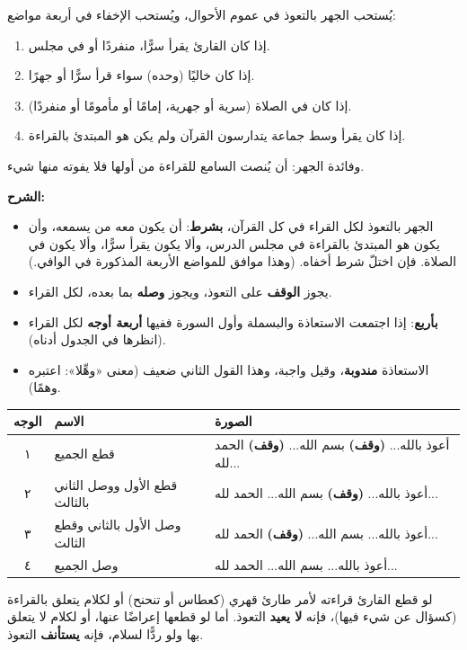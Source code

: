 \begin{qaida}
يُستحب الجهر بالتعوذ في عموم الأحوال، ويُستحب الإخفاء في أربعة مواضع:
\begin{enumerate}
\item إذا كان القارئ يقرأ سرًّا، منفردًا أو في مجلس.
\item إذا كان خاليًا (وحده) سواء قرأ سرًّا أو جهرًا.
\item إذا كان في الصلاة (سرية أو جهرية، إمامًا أو مأمومًا أو منفردًا).
\item إذا كان يقرأ وسط جماعة يتدارسون القرآن ولم يكن هو المبتدئ بالقراءة.
\end{enumerate}
وفائدة الجهر: أن يُنصت السامع للقراءة من أولها فلا يفوته منها شيء.
\end{qaida}

\begin{tahrir}
\medskip
\textbf{الشرح:}
\begin{itemize}
\item الجهر بالتعوذ لكل القراء في كل القرآن، \textbf{بشرط}: أن يكون معه من يسمعه، وأن يكون هو المبتدئ بالقراءة في مجلس الدرس، وألا يكون يقرأ سرًّا، وألا يكون في الصلاة. فإن اختلّ شرط أخفاه. (وهذا موافق للمواضع الأربعة المذكورة في الوافي.)
\item يجوز \textbf{الوقف} على التعوذ، ويجوز \textbf{وصله} بما بعده، لكل القراء.
\item \textbf{بأربع}: إذا اجتمعت الاستعاذة والبسملة وأول السورة ففيها \textbf{أربعة أوجه} لكل القراء (انظرها في الجدول أدناه).
\item الاستعاذة \textbf{مندوبة}، وقيل واجبة، وهذا القول الثاني ضعيف (معنى «وهِّلا»: اعتبره وهمًا).
\end{itemize}
\end{tahrir}

\begin{khulasa}
\centering
\renewcommand{\arraystretch}{1.5}
\begin{tabular}{c l l}
\toprule
\textbf{الوجه} & \textbf{الاسم} & \textbf{الصورة}\\
\midrule
١ & قطع الجميع & أعوذ بالله... \textbf{(وقف)} بسم الله... \textbf{(وقف)} الحمد لله...\\
٢ & قطع الأول ووصل الثاني بالثالث & أعوذ بالله... \textbf{(وقف)} بسم الله... الحمد لله...\\
٣ & وصل الأول بالثاني وقطع الثالث & أعوذ بالله... بسم الله... \textbf{(وقف)} الحمد لله...\\
٤ & وصل الجميع & أعوذ بالله... بسم الله... الحمد لله...\\
\bottomrule
\end{tabular}
\end{khulasa}

\begin{tanbih}
لو قطع القارئ قراءته لأمر طارئ قهري (كعطاس أو تنحنح) أو لكلام يتعلق بالقراءة (كسؤال عن شيء فيها)، فإنه \textbf{لا يعيد} التعوذ.
أما لو قطعها إعراضًا عنها، أو لكلام لا يتعلق بها ولو ردًّا لسلام، فإنه \textbf{يستأنف} التعوذ.
\end{tanbih}
